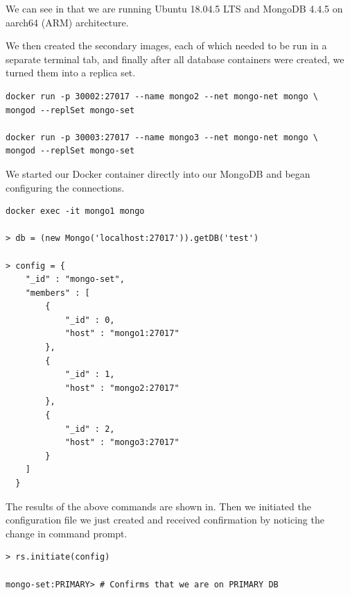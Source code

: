 \documentclass{article}
\begin{document}
\newpage
We can see in  that we are running Ubuntu 18.04.5 LTS and MongoDB 4.4.5 on aarch64 (ARM) architecture.


We then created the secondary images, each of which needed to be run in a separate terminal tab, and finally after all database containers were created, we turned them into a replica set.

\begin{tcolorbox}[colback=CrispBlue!5!white,colframe=CrispBlue!75!black,title=Create secondary MongoDB images]    
\begin{verbatim}    
docker run -p 30002:27017 --name mongo2 --net mongo-net mongo \
mongod --replSet mongo-set

docker run -p 30003:27017 --name mongo3 --net mongo-net mongo \
mongod --replSet mongo-set
\end{verbatim}
\end{tcolorbox}

\newpage

We started our Docker container directly into our MongoDB and began configuring the connections.
\begin{tcolorbox}[colback=CrispBlue!5!white,colframe=CrispBlue!75!black,title=Connect to \texttt{mongo1} and configure it to be the primary]
\begin{verbatim}
docker exec -it mongo1 mongo

> db = (new Mongo('localhost:27017')).getDB('test')

> config = {
  	"_id" : "mongo-set",
  	"members" : [
  		{
  		    "_id" : 0,
  		    "host" : "mongo1:27017"
  		},
  		{
  		    "_id" : 1,
  		    "host" : "mongo2:27017"
  		},
  		{
  		    "_id" : 2,
  		    "host" : "mongo3:27017"
  		}
  	]
  }
\end{verbatim}
\end{tcolorbox}

The results of the above commands are shown in. Then we initiated the configuration file we just created and received confirmation by noticing the change in command prompt.

\begin{tcolorbox}[colback=CrispBlue!5!white,colframe=CrispBlue!75!black,title=Initiate our replica set using our just created config file]
\begin{verbatim}
> rs.initiate(config)

mongo-set:PRIMARY> # Confirms that we are on PRIMARY DB
\end{verbatim}
\end{tcolorbox}
\end{document}
